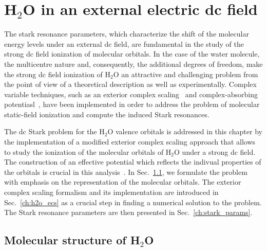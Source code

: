 \chapter{H$_{2}$O in an external electric dc field}
\label{cha:dc_h2o}


The stark resonance parameters, which characterize the shift of the
molecular energy levels under an external dc field, are fundamental in
the study of the strong dc field ionization of molecular orbitals. In
the case of the water molecule, the multicentre nature and,
consequently, the additional degrees of freedom, make the strong dc
field ionization of H$_{2}$O an attractive and challenging problem
from the point of view of a theoretical description as well as
experimentally. Complex variable techniques, such as an exterior
complex scaling~\cite{Simon_1979,Scrinzi_2010} and complex-absorbing
potentiasl~\cite{RissMeyer_1993,Krause_2014}, have been implemented in
order to address the problem of molecular static-field ionization and
compute the induced Stark resonances.

The dc Stark problem for the H$_{2}$O valence orbitals is addressed in
this chapter by the implementation of a modified exterior complex
scaling approach that allows to study the ionization of the molecular
orbitals of H$_{2}$O under a strong dc field. The construction of an
effective potential which reflects the indivual properties of the
orbitals is crucial in this
analysis~\cite{sarias_2016,sarias_2017}. In
Sec.~\ref{ch:h2o_structure}, we formulate the problem with emphasis on
the representation of the molecular orbitals. The exterior complex
scaling formalism and its implementation are introduced in
Sec.~\ref{ch:h2o_ecs} as a crucial step in finding a numerical
solution to the problem. The Stark resonance parameters are then
presented in Sec.~\ref{ch:stark_params}.





\section{Molecular structure of H$_{2}$O}
\label{ch:h2o_structure}


